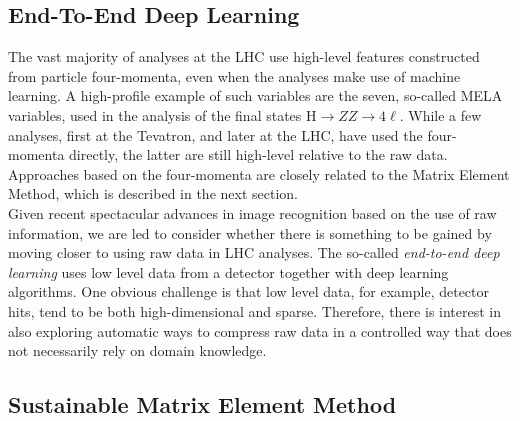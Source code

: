 \subsection{End-To-End Deep Learning}\label{subsec:endtoend}
\label{sec:applications-e2e}
The vast majority of analyses at the LHC use high-level features constructed from particle four-momenta, even when the analyses make use of machine learning. A high-profile example of such variables are the seven, so-called MELA variables, used in the analysis of the final states $\textrm{H} \rightarrow ZZ \rightarrow 4\ell$. While a few analyses, first at the Tevatron, and later at the LHC, have used the four-momenta directly, the latter are still high-level relative to the raw data. Approaches based on the four-momenta are closely related to the Matrix Element Method, which is described in the next section.\\

Given recent spectacular advances in image recognition based on the use of raw information, we are led to consider whether there is something to be gained by moving closer to using raw data in LHC analyses. The so-called \emph{end-to-end deep learning} uses low level data from a detector together with deep learning algorithms. One obvious challenge is that low level data, for example, detector hits, tend to be both high-dimensional and sparse.
Therefore, there is interest in also exploring automatic ways to compress raw data in a controlled way that does not necessarily rely on domain knowledge.


\subsection{Sustainable Matrix Element Method}
\label{sec:applications-MEM}


